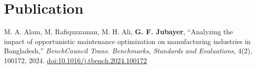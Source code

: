 \documentclass[letterpaper,10pt]{article}
\begin{document}
\section{Publication}
 \begin{itemize}[leftmargin=0.1in, label={}]
    \small{\item{
     M. A. Alam, M. Rafiquzzaman, M. H. Ali, \textbf{G. F. Jubayer}, ``Analyzing the impact of opportunistic maintenance optimization on manufacturing industries in Bangladesh,'' \textit{BenchCouncil Trans. Benchmarks, Standards and Evaluations}, 4(2), 100172, 2024. \href{https://doi.org/10.1016/j.tbench.2024.100172}{doi:10.1016/j.tbench.2024.100172}
    }}
 \end{itemize}
\end{document}
